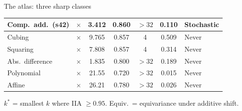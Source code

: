 \documentclass[aspectratio=169,11pt]{beamer}
\begin{document}
\begin{frame}{The atlas: three sharp classes}
{\begin{tabular}{lcccccl}
Comp.\ add.\ (s42) & $\times$ & 3.412 & 0.860 & ${>}32$ & 0.110 & \textcolor{stoch}{Stochastic} \\
\midrule
Cubing & $\times$ & 9.765 & 0.857 & 4 & 0.509 & \textcolor{never}{Never} \\
Squaring & $\times$ & 7.808 & 0.857 & 4 & 0.314 & \textcolor{never}{Never} \\
Abs.\ difference & $\times$ & 1.835 & 0.800 & ${>}32$ & 0.189 & \textcolor{never}{Never} \\
Polynomial & $\times$ & 21.55 & 0.720 & ${>}32$ & 0.015 & \textcolor{never}{Never} \\
Affine & $\times$ & 26.21 & 0.780 & ${>}32$ & 0.026 & \textcolor{never}{Never} \\
\bottomrule
\end{tabular}}

\vspace{0.2em}
{\small $k^*$ = smallest $k$ where IIA $\geq 0.95$. Equiv.\ = equivariance under additive shift.}
\end{frame}
\end{document}
